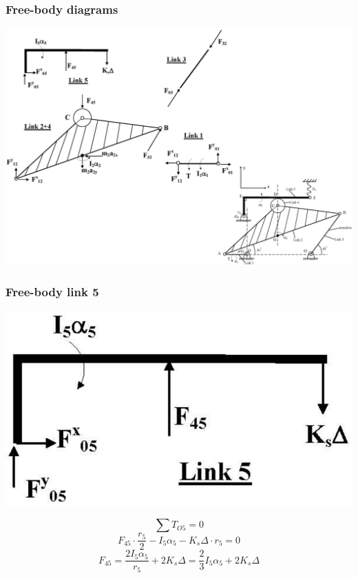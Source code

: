 \documentclass[11pt]{article}
\begin{document}
\subsubsection{Free-body diagrams}
\label{sec:org8a148a8}
\begin{center}
\includegraphics[width=.9\linewidth]{./images/dynamic-force-analysis-example-3-free-body-diagrams.png}
\end{center}

 \newpage
\subsubsection{Free-body link 5}
\label{sec:org85bcbe8}
\begin{center}
\includegraphics[width=.9\linewidth]{./images/dynamic-force-analysis-example-3-link-5-free-body-diagram.png}
\end{center}

\[\sum T_{O5} = 0\]
\[F_{45} \cdot \frac{r_5}{2} - I_5 \alpha_5 - K_s \Delta \cdot r_5 = 0\]
\[F_{45} = \frac{2 I_5 \alpha_5}{r_5} + 2K_s \Delta = \frac{2}{3} I_5 \alpha_5 + 2K_s \Delta\]
\end{document}
